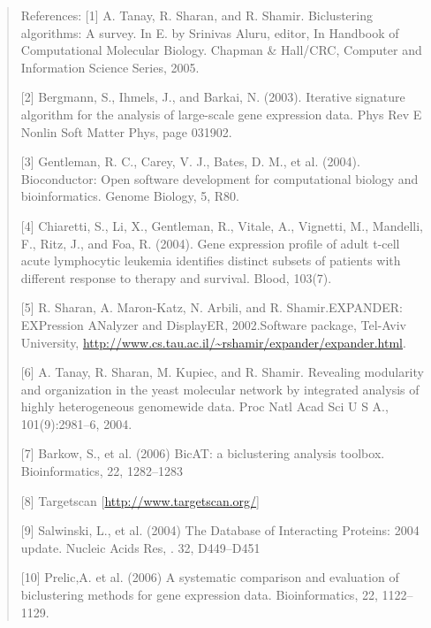 \documentclass[a4paper]{article}
\begin{document}
\begin{quote}
References:
[1] A. Tanay, R. Sharan, and R. Shamir. Biclustering algorithms: A
survey. In E. by Srinivas Aluru, editor, In Handbook of Computational
Molecular Biology. Chapman \& Hall/CRC, Computer and Information
Science Series, 2005. 

[2] Bergmann, S., Ihmels, J., and Barkai, N. (2003). Iterative
signature algorithm for the analysis of large-scale gene expression
data. Phys Rev E Nonlin Soft Matter Phys, page 031902.

[3] Gentleman, R. C., Carey, V. J., Bates, D. M., et
al. (2004). Bioconductor: Open software development for computational
biology and bioinformatics. Genome Biology, 5, R80. 

[4] Chiaretti, S., Li, X., Gentleman, R., Vitale, A., Vignetti, M.,
Mandelli, F., Ritz, J., and Foa, R. (2004). Gene expression profile of
adult t-cell acute lymphocytic leukemia identifies distinct subsets of
patients with different response to therapy and survival. Blood,
103(7).

[5] R. Sharan, A. Maron-Katz, N. Arbili, and R. Shamir.EXPANDER:
EXPression ANalyzer and DisplayER, 2002.Software package, Tel-Aviv
University, \url{http://www.cs.tau.ac.il/~rshamir/expander/expander.html}.

[6] A. Tanay, R. Sharan, M. Kupiec, and R. Shamir. Revealing
modularity and organization in the yeast molecular network by
integrated analysis of highly heterogeneous genomewide data. Proc Natl
Acad Sci U S A., 101(9):2981–6, 2004. 

[7] Barkow, S., et al. (2006) BicAT: a biclustering analysis
toolbox. Bioinformatics, 22, 1282–1283 

[8] Targetscan [\url{http://www.targetscan.org/}]

[9] Salwinski, L., et al. (2004) The Database of Interacting Proteins:
2004 update. Nucleic Acids Res, . 32, D449–D451

[10] Prelic,A. et al. (2006) A systematic comparison and evaluation of
biclustering methods for gene expression data. Bioinformatics, 22,
1122–1129. 
\end{quote}
\end{document}
